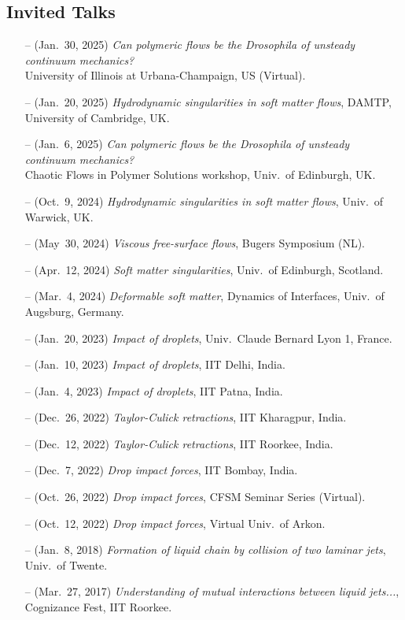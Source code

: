 \documentclass[10pt,a4paper,colorlinks,linkcolor=blue,urlcolor=blue,citecolor=blue]{moderncv}
\begin{document}
\subsection{Invited Talks}
\begin{itemize}[leftmargin=1.25em]
\item[--] (Jan.~30, 2025) \emph{Can polymeric flows be the Drosophila of unsteady continuum mechanics?} \\
  University of Illinois at Urbana-Champaign, US (Virtual).
\item[--] (Jan.~20, 2025) \emph{Hydrodynamic singularities in soft matter flows}, DAMTP, University of Cambridge, UK.
\item[--] (Jan.~6, 2025) \emph{Can polymeric flows be the Drosophila of unsteady continuum mechanics?}\\
  Chaotic Flows in Polymer Solutions workshop, Univ.~of Edinburgh, UK.
\item[--] (Oct.~9, 2024) \emph{Hydrodynamic singularities in soft matter flows}, Univ.~of Warwick, UK.
\item[--] (May~30, 2024) \emph{Viscous free-surface flows}, Bugers Symposium (NL).
\item[--] (Apr.~12, 2024) \emph{Soft matter singularities}, Univ.~of Edinburgh, Scotland.
\item[--] (Mar.~4, 2024) \emph{Deformable soft matter}, Dynamics of Interfaces, Univ.~of Augsburg, Germany.
\item[--] (Jan.~20, 2023) \emph{Impact of droplets}, Univ.~Claude Bernard Lyon 1, France.
\item[--] (Jan.~10, 2023) \emph{Impact of droplets}, IIT Delhi, India.
\item[--] (Jan.~4, 2023) \emph{Impact of droplets}, IIT Patna, India.
\item[--] (Dec.~26, 2022) \emph{Taylor-Culick retractions}, IIT Kharagpur, India.
\item[--] (Dec.~12, 2022) \emph{Taylor-Culick retractions}, IIT Roorkee, India.
\item[--] (Dec.~7, 2022) \emph{Drop impact forces}, IIT Bombay, India.
\item[--] (Oct.~26, 2022) \emph{Drop impact forces}, CFSM Seminar Series (Virtual).
\item[--] (Oct.~12, 2022) \emph{Drop impact forces}, Virtual Univ.~of Arkon.
\item[--] (Jan.~8, 2018) \emph{Formation of liquid chain by collision of two laminar jets}, Univ.~of Twente.
\item[--] (Mar.~27, 2017) \emph{Understanding of mutual interactions between liquid jets...}, Cognizance Fest, IIT Roorkee.
\end{itemize}
\end{document}
